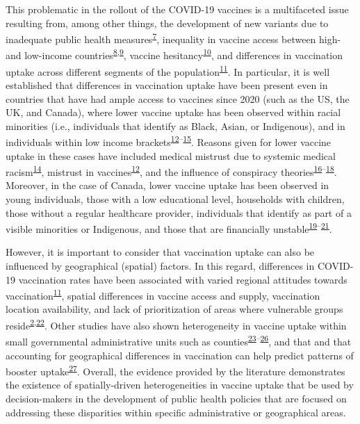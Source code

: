 \documentclass[
  letterpaper,
  DIV=11,
  numbers=noendperiod]{scrartcl}
\begin{document}
This problematic in the rollout of the COVID-19 vaccines is a
multifaceted issue resulting from, among other things, the development
of new variants due to inadequate public health
measures\textsuperscript{\protect\hyperlink{ref-li2021}{7}}, inequality
in vaccine access between high- and low-income
countries\textsuperscript{\protect\hyperlink{ref-gerretsen2021}{8},\protect\hyperlink{ref-tamey2022}{9}},
vaccine
hesitancy\textsuperscript{\protect\hyperlink{ref-nafilyan2021}{10}}, and
differences in vaccination uptake across different segments of the
population\textsuperscript{\protect\hyperlink{ref-malik2020}{11}}. In
particular, it is well established that differences in vaccination
uptake have been present even in countries that have had ample access to
vaccines since 2020 (such as the US, the UK, and Canada), where lower
vaccine uptake has been observed within racial minorities (i.e.,
individuals that identify as Black, Asian, or Indigenous), and in
individuals within low income
brackets\textsuperscript{\protect\hyperlink{ref-willis2021}{12}--\protect\hyperlink{ref-khubchandani2021}{15}}.
Reasons given for lower vaccine uptake in these cases have included
medical mistrust due to systemic medical
racism\textsuperscript{\protect\hyperlink{ref-stoler2021}{14}}, mistrust
in vaccines\textsuperscript{\protect\hyperlink{ref-willis2021}{12}}, and
the influence of conspiracy
theories\textsuperscript{\protect\hyperlink{ref-bogart2021}{16}--\protect\hyperlink{ref-freeman2020}{18}}.
Moreover, in the case of Canada, lower vaccine uptake has been observed
in young individuals, those with a low educational level, households
with children, those without a regular healthcare provider, individuals
that identify as part of a visible minorities or Indigenous, and those
that are financially
unstable\textsuperscript{\protect\hyperlink{ref-guay2022}{19}--\protect\hyperlink{ref-hussain2022}{21}}.

However, it is important to consider that vaccination uptake can also be
influenced by geographical (spatial) factors. In this regard,
differences in COVID-19 vaccination rates have been associated with
varied regional attitudes towards
vaccination\textsuperscript{\protect\hyperlink{ref-malik2020}{11}},
spatial differences in vaccine access and supply, vaccination location
availability, and lack of prioritization of areas where vulnerable
groups
reside\textsuperscript{\protect\hyperlink{ref-bogoch2022}{2},\protect\hyperlink{ref-nguyen2021}{22}}.
Other studies have also shown heterogeneity in vaccine uptake within
small governmental administrative units such as
counties\textsuperscript{\protect\hyperlink{ref-mollalo2021}{23}--\protect\hyperlink{ref-bhuiyan2022}{26}},
and that and that accounting for geographical differences in vaccination
can help predict patterns of booster
uptake\textsuperscript{\protect\hyperlink{ref-wood2022}{27}}. Overall,
the evidence provided by the literature demonstrates the existence of
spatially-driven heterogeneities in vaccine uptake that be used by
decision-makers in the development of public health policies that are
focused on addressing these disparities within specific administrative
or geographical areas.
\end{document}
